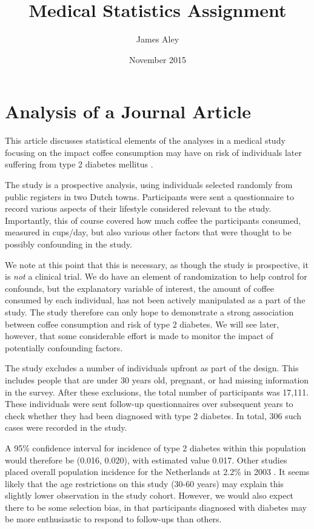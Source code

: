 \documentclass{article}
\title{Medical Statistics Assignment}
\author{James Aley}
\date{November 2015}
\begin{document}
\maketitle

\section{Analysis of a Journal Article}

This article discusses statistical elements of the analyses in a
medical study focusing on the impact coffee consumption may have on
risk of individuals later suffering from type 2 diabetes mellitus
\cite{vandam}.

The study is a prospective analysis, using individuals
selected randomly from public registers in two Dutch
towns. Participants were sent a questionnaire to record various
aspects of their lifestyle considered relevant to the
study. Importantly, this of course covered how much coffee the
participants consumed, measured in cups/day, but also various other
factors that were thought to be possibly confounding in the study.

We note at this point that this is necessary, as though the study is
prospective, it is \emph{not} a clinical trial. We do have an element
of randomization to help control for confounds, but the explanatory
variable of interest, the  amount of coffee consumed by each
individual, has not been actively manipulated as a part of the
study. The study therefore can only hope to demonstrate a strong
association between coffee consumption and risk of type 2 diabetes. We
will see later, however, that some considerable effort is made to
monitor the impact of potentially confounding factors.

The study excludes a number of individuals upfront as part of the
design. This includes people that are under 30 years old, pregnant, or
had missing information in the survey. After these exclusions, the
total number of participants was 17,111. These individuals were sent
follow-up questionnaires over subsequent years to check whether they
had been diagnosed with type 2 diabetes. In total, 306 such cases were
recorded in the study.

A 95\% confidence interval for incidence of type 2 diabetes within
this population would therefore be (0.016, 0.020), with estimated
value 0.017. Other studies placed overall population incidence for the
Netherlands at 2.2\% in 2003 \cite{prevalence}. It seems likely that
the age restrictions on this study (30-60 years) may explain this
slightly lower observation in the study cohort. However, we would also
expect there to be some selection bias, in that participants diagnosed
with diabetes may be more enthusiastic to respond to follow-ups than
others.
\end{document}
